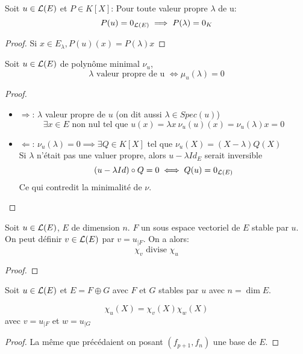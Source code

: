 \begin{prop}
	Soit $u \in \mathcal{L}(E)$ et $P \in K[X]$: Pour toute valeur propre $\lambda$ de u:
	$$ P(u) = 0_{\mathcal{L}(E)} \implies P(\lambda) = 0_K$$
\end{prop}

\begin{proof}
	Si $x \in E_\lambda , P(u)(x) = P(\lambda) x$ %
\end{proof}


\begin{prop}
	Soit $u \in \mathcal{L}(E)$ de polynôme minimal $\nu_u$,
	$$ \lambda \text{ valeur propre de u }\iff \mu_u(\lambda) = 0$$
\end{prop}


\begin{proof}
	\begin{itemize}
		\item  $\Rightarrow$:
		      $\lambda$ valeur propre de $u$ (on dit aussi $\lambda \in Spec(u)$)
		      $$\exists x \in E \text { non nul tel que } u(x) = \lambda x \ \nu_u(u)(x) = \nu_u(\lambda)x =0$$
		\item $\Leftarrow$:
		      $\nu_u(\lambda) = 0 \implies \exists Q \in K[X]$ tel que $\nu_u(X) = (X - \lambda)Q(X)$\\
		      Si $\lambda$ n'était pas une valuer propre, alors $u-\lambda Id_E$ serait inversible
		      $$ (u-  \lambda Id) \circ Q = 0 \iff Q(u) = 0_{\mathcal{L}(E)}$$
		      Ce qui contredit la minimalité de $\nu$.
	\end{itemize}
\end{proof}



\begin{prop}
	Soit $u \in \mathcal{L}(E)$, $E$ de dimension $n$.
	$F$ un sous espace vectoriel de $E$ stable par $u$.
	On peut définir $v \in \mathcal{L}(E)$ par $v = u_{|F}$. On a alors:
	$$\chi_v \text{ divise } \chi_u$$
\end{prop}

\begin{proof}
\end{proof}

\begin{prop}
	Soit $u \in \mathcal{L}(E)$ et $E = F \oplus G$ avec $F$ et $G$ stables par $u$ avec $n = \dim E$.

	$$\chi_u (X)= \chi_v (X) \chi_w(X)$$
	avec $v = u_{|F}$ et $w = u_{|G}$
\end{prop}

\begin{proof}
	La même que précédaient on posant $(f_{p+1}, f_n)$ une base de $E$.
\end{proof}

